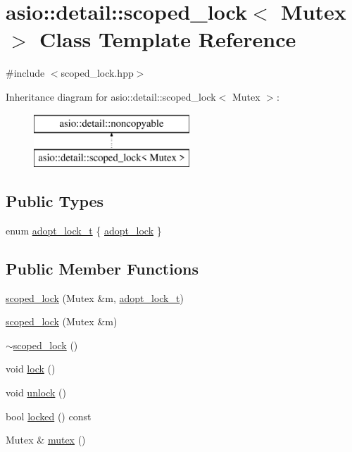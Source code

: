 \hypertarget{classasio_1_1detail_1_1scoped__lock}{}\section{asio\+:\+:detail\+:\+:scoped\+\_\+lock$<$ Mutex $>$ Class Template Reference}
\label{classasio_1_1detail_1_1scoped__lock}


{\ttfamily \#include $<$scoped\+\_\+lock.\+hpp$>$}

Inheritance diagram for asio\+:\+:detail\+:\+:scoped\+\_\+lock$<$ Mutex $>$\+:\begin{figure}[H]
\begin{center}
\leavevmode
\includegraphics[height=2.000000cm]{classasio_1_1detail_1_1scoped__lock}
\end{center}
\end{figure}
\subsection*{Public Types}
\begin{DoxyCompactItemize}
\item 
enum \hyperlink{classasio_1_1detail_1_1scoped__lock_a85a2e4163d034f8449aa4f42ea9a00bf}{adopt\+\_\+lock\+\_\+t} \{ \hyperlink{classasio_1_1detail_1_1scoped__lock_a85a2e4163d034f8449aa4f42ea9a00bfa54c63380b373ee584131d2bfc194f83e}{adopt\+\_\+lock}
 \}
\end{DoxyCompactItemize}
\subsection*{Public Member Functions}
\begin{DoxyCompactItemize}
\item 
\hyperlink{classasio_1_1detail_1_1scoped__lock_a136d2edf2a2828f744fb88c2742173b5}{scoped\+\_\+lock} (Mutex \&m, \hyperlink{classasio_1_1detail_1_1scoped__lock_a85a2e4163d034f8449aa4f42ea9a00bf}{adopt\+\_\+lock\+\_\+t})
\item 
\hyperlink{classasio_1_1detail_1_1scoped__lock_a1973bbc24f8e8f1967120ec7b9f2ddd7}{scoped\+\_\+lock} (Mutex \&m)
\item 
\hyperlink{classasio_1_1detail_1_1scoped__lock_a8bd3010e819074fa25c14303571cd3f4}{$\sim$scoped\+\_\+lock} ()
\item 
void \hyperlink{classasio_1_1detail_1_1scoped__lock_a32b8e65d7ed6ac12ce2d3e242d861d32}{lock} ()
\item 
void \hyperlink{classasio_1_1detail_1_1scoped__lock_a27469133c476c189f7c81c7c80d222e7}{unlock} ()
\item 
bool \hyperlink{classasio_1_1detail_1_1scoped__lock_a6a5bc674ca3a271d9cf0c404d6aa72bc}{locked} () const 
\item 
Mutex \& \hyperlink{classasio_1_1detail_1_1scoped__lock_a20cf49f8ea560cbd896c3e397ab6ac7b}{mutex} ()
\end{DoxyCompactItemize}


